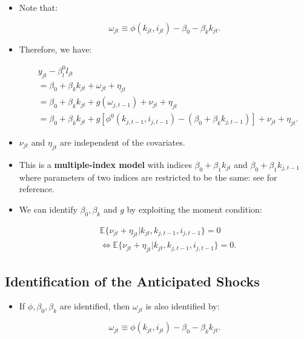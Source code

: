 \documentclass[]{book}
\providecommand{\tightlist}{%
  \setlength{\itemsep}{0pt}\setlength{\parskip}{0pt}}
\begin{document}
\begin{itemize}
\tightlist
\item
  Note that:

  \begin{equation}
  \omega_{jt} \equiv \phi(k_{jt}, i_{jt}) - \beta_0 - \beta_k k_{jt}.
  \end{equation}
\item
  Therefore, we have:

  \begin{equation}
  \begin{split}
  &y_{jt} - \beta_l^0 l_{jt} \\
  &= \beta_0 + \beta_k k_{jt} + \omega_{jt} + \eta_{jt}\\
  &= \beta_0 + \beta_k k_{jt} + g(\omega_{j, t - 1}) + \nu_{jt} + \eta_{jt}\\
  &= \beta_0 + \beta_k k_{jt} + g[\phi^0(k_{j, t - 1}, i_{j, t - 1}) - (\beta_0 + \beta_k k_{j, t - 1})] + \nu_{jt} + \eta_{jt}.
  \end{split}
  \end{equation}
\item
  \(\nu_{jt}\) and \(\eta_{jt}\) are independent of the covariates.
\item
  This is a \textbf{multiple-index model} with indices
  \(\beta_0 + \beta_1 k_{jt}\) and \(\beta_0 + \beta_1 k_{j, t - 1}\)
  where parameters of two indices are restricted to be the same: see
  \citet{Ichimura2007} for reference.
\item
  We can identify \(\beta_0, \beta_k\) and \(g\) by exploiting the
  moment condition:

  \begin{equation}
  \begin{split}
  & \mathbb{E}\{\nu_{jt} + \eta_{jt}|k_{jt}, k_{j, t - 1}, i_{j, t - 1}\} = 0\\
  & \Leftrightarrow \mathbb{E}\{\nu_{jt} + \eta_{jt}|k_{jt}, k_{j, t - 1}, i_{j, t - 1}\} = 0.
  \end{split}
  \end{equation}
\end{itemize}

\subsection{Identification of the Anticipated
Shocks}\label{identification-of-the-anticipated-shocks}

\begin{itemize}
\tightlist
\item
  If \(\phi, \beta_0, \beta_k\) are identified, then \(\omega_{jt}\) is
  also identified by:

  \begin{equation}
  \omega_{jt} \equiv \phi(k_{jt}, i_{jt}) - \beta_0 - \beta_k k_{jt}.
  \end{equation}
\end{itemize}
\end{document}
